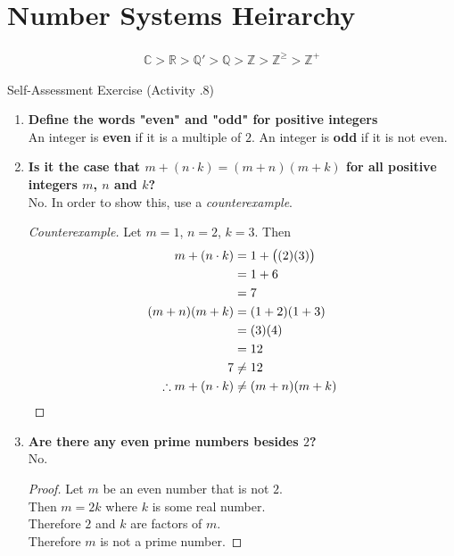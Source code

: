 \documentclass[../notes.tex]{subfiles}
\begin{document}
		\section{Number Systems Heirarchy}
			\begin{align*}
				\mathbb{C} > \mathbb{R} > \mathbb{Q}' > \mathbb{Q} > \mathbb{Z} > \mathbb{Z}^{\geq} > \mathbb{Z}^{+}
			\end{align*}
			\pagebreak
			\begin{exercise}{Self-Assessment Exercise (Activity \thechapter.8)}
				\begin{enumerate}
					\item \textbf{Define the words "even" and "odd" for positive integers}\\
						An integer is \textbf{even} if it is a multiple of $2$. An integer is \textbf{odd} if it is not even.
					\item \textbf{Is it the case that $m + (n\cdot k) = (m + n)(m + k)$ for all positive integers $m$, $n$ and $k$?}\\
						No. In order to show this, use a \textit{counterexample}. \rule{0pt}{11pt} \vspace*{-18pt}
						\begin{proof}[Counterexample]
							Let $m = 1$, $n = 2$, $k = 3$. Then
							\begin{align*}
								m + (n \cdot k) &= 1 + \bigl((2)(3)\bigr)\\
								&= 1 + 6\\
								&= 7\\
								(m + n)(m + k) &= (1 + 2)(1 + 3)\\
								&= (3)(4)\\
								&= 12\\
								7 &\neq 12\\
								\therefore m + (n \cdot k) &\neq (m + n)(m + k) \qedhere
							\end{align*}
						\end{proof}
					\item \textbf{Are there any even prime numbers besides $2$?}\\
					No. \rule{0pt}{11pt} \vspace*{-18pt}
					\begin{proof}
						Let $m$ be an even number that is not $2$.\\
						Then $m = 2k$ where $k$ is some real number.\\
						Therefore $2$ and $k$ are factors of $m$.\\
						Therefore $m$ is not a prime number.

\end{proof}
\end{enumerate}
\end{exercise}
\end{document}
